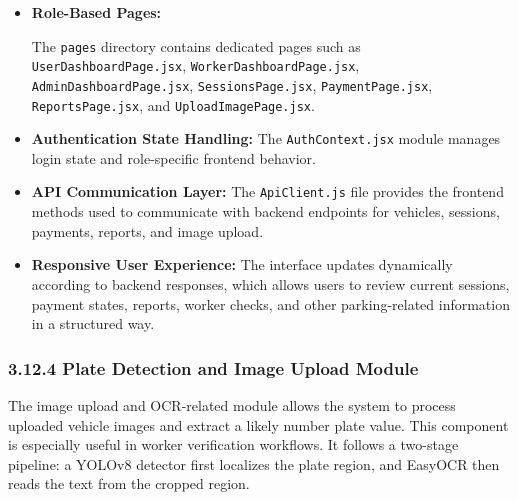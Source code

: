 \documentclass[12pt,a4paper,oneside]{report}
\begin{document}
\begin{itemize}[leftmargin=2em]
    \item \textbf{Role-Based Pages:} {\sloppy The \texttt{pages} directory contains dedicated pages such as \texttt{User\-Dashboard\-Page.jsx}, \texttt{Worker\-Dashboard\-Page.jsx}, \texttt{Admin\-Dashboard\-Page.jsx}, \texttt{Sessions\-Page.jsx}, \texttt{Payment\-Page.jsx}, \texttt{Reports\-Page.jsx}, and \texttt{Upload\-Image\-Page.jsx}.\par}

    \item \textbf{Authentication State Handling:} The \texttt{AuthContext.jsx} module manages login state and role-specific frontend behavior.

    \item \textbf{API Communication Layer:} The \texttt{ApiClient.js} file provides the frontend methods used to communicate with backend endpoints for vehicles, sessions, payments, reports, and image upload.

    \item \textbf{Responsive User Experience:} The interface updates dynamically according to backend responses, which allows users to review current sessions, payment states, reports, worker checks, and other parking-related information in a structured way.
\end{itemize}

\subsubsection*{3.12.4 Plate Detection and Image Upload Module}

The image upload and OCR-related module allows the system to process uploaded vehicle images and extract a likely number plate value. This component is especially useful in worker verification workflows. It follows a two-stage pipeline: a YOLOv8 detector first localizes the plate region, and EasyOCR then reads the text from the cropped region.
\end{document}
